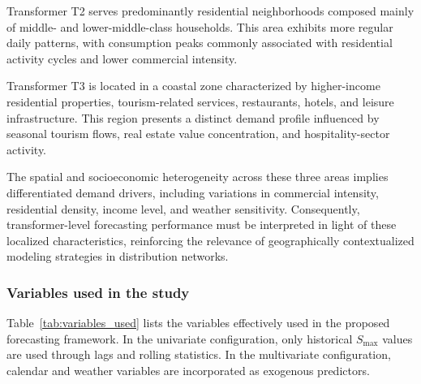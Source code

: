 Transformer T2 serves predominantly residential neighborhoods composed mainly of middle- and lower-middle-class households. This area exhibits more regular daily patterns, with consumption peaks commonly associated with residential activity cycles and lower commercial intensity.

Transformer T3 is located in a coastal zone characterized by higher-income residential properties, tourism-related services, restaurants, hotels, and leisure infrastructure. This region presents a distinct demand profile influenced by seasonal tourism flows, real estate value concentration, and hospitality-sector activity.

The spatial and socioeconomic heterogeneity across these three areas implies differentiated demand drivers, including variations in commercial intensity, residential density, income level, and weather sensitivity. Consequently, transformer-level forecasting performance must be interpreted in light of these localized characteristics, reinforcing the relevance of geographically contextualized modeling strategies in distribution networks.


\subsubsection{Variables used in the study}
Table~\ref{tab:variables_used} lists the variables effectively used in the proposed forecasting framework. In the univariate configuration, only historical $S_{\max}$ values are used through lags and rolling statistics. In the multivariate configuration, calendar and weather variables are incorporated as exogenous predictors.

